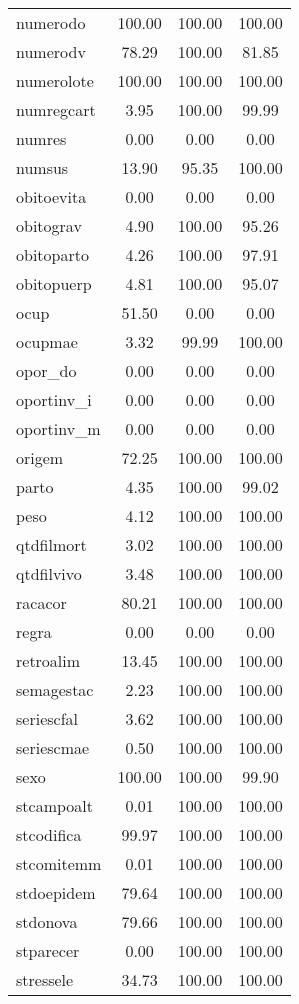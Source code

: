 \documentclass[
  12,
  table]{proadi}
\begin{document}
\begin{longtable}{lccc}
\addlinespace
numerodo & 100.00 & 100.00 & 100.00\\
numerodv & 78.29 & 100.00 & 81.85\\
numerolote & 100.00 & 100.00 & 100.00\\
numregcart & 3.95 & 100.00 & 99.99\\
numres & 0.00 & 0.00 & 0.00\\
\addlinespace
numsus & 13.90 & 95.35 & 100.00\\
obitoevita & 0.00 & 0.00 & 0.00\\
obitograv & 4.90 & 100.00 & 95.26\\
obitoparto & 4.26 & 100.00 & 97.91\\
obitopuerp & 4.81 & 100.00 & 95.07\\
\addlinespace
ocup & 51.50 & 0.00 & 0.00\\
ocupmae & 3.32 & 99.99 & 100.00\\
opor\_do & 0.00 & 0.00 & 0.00\\
oportinv\_i & 0.00 & 0.00 & 0.00\\
oportinv\_m & 0.00 & 0.00 & 0.00\\
\addlinespace
origem & 72.25 & 100.00 & 100.00\\
parto & 4.35 & 100.00 & 99.02\\
peso & 4.12 & 100.00 & 100.00\\
qtdfilmort & 3.02 & 100.00 & 100.00\\
qtdfilvivo & 3.48 & 100.00 & 100.00\\
\addlinespace
racacor & 80.21 & 100.00 & 100.00\\
regra & 0.00 & 0.00 & 0.00\\
retroalim & 13.45 & 100.00 & 100.00\\
semagestac & 2.23 & 100.00 & 100.00\\
seriescfal & 3.62 & 100.00 & 100.00\\
\addlinespace
seriescmae & 0.50 & 100.00 & 100.00\\
sexo & 100.00 & 100.00 & 99.90\\
stcampoalt & 0.01 & 100.00 & 100.00\\
stcodifica & 99.97 & 100.00 & 100.00\\
stcomitemm & 0.01 & 100.00 & 100.00\\
\addlinespace
stdoepidem & 79.64 & 100.00 & 100.00\\
stdonova & 79.66 & 100.00 & 100.00\\
stparecer & 0.00 & 100.00 & 100.00\\
stressele & 34.73 & 100.00 & 100.00\\

\end{longtable}
\end{document}
